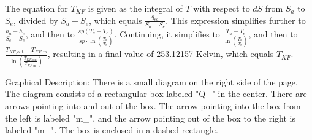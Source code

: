 The equation for \( T_{KF} \) is given as the integral of \( T \) with respect to \( dS \) from \( S_a \) to \( S_e \), divided by \( S_a - S_e \), which equals \( \frac{q_{ea}}{S_a - S_e} \). This expression simplifies further to \( \frac{h_a - h_e}{S_e - S_e} \), and then to \( \frac{sp (T_a - T_e)}{sp \cdot \ln \left( \frac{T_a}{T_e} \right)} \). Continuing, it simplifies to \( \frac{T_a - T_e}{\ln \left( \frac{T_a}{T_e} \right)} \), and then to \( \frac{T_{KF, \text{out}} - T_{KF, \text{in}}}{\ln \left( \frac{T_{KF, \text{out}}}{T_{KF, \text{in}}} \right)} \), resulting in a final value of 253.12157 Kelvin, which equals \( T_{KF} \).

Graphical Description:
There is a small diagram on the right side of the page. The diagram consists of a rectangular box labeled "Q_{}" in the center. There are arrows pointing into and out of the box. The arrow pointing into the box from the left is labeled "m_{}", and the arrow pointing out of the box to the right is labeled "m_{}". The box is enclosed in a dashed rectangle.